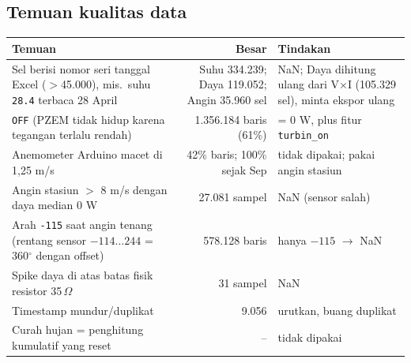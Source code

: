 \documentclass[10.5pt,a4paper]{article}
\newcommand{\cmd}[1]{\texttt{#1}}
\begin{document}
\subsection{Temuan kualitas data}
\begin{center}
\small
\begin{tabularx}{\linewidth}{@{}X r X@{}}
\toprule
Temuan & Besar & Tindakan \\
\midrule
Sel berisi nomor seri tanggal Excel ($>$45.000), mis.\ suhu \cmd{28.4} terbaca 28 April & Suhu 334.239; Daya 119.052; Angin 35.960 sel & NaN; Daya dihitung ulang dari V$\times$I (105.329 sel), minta ekspor ulang \\
\cmd{OFF} (PZEM tidak hidup karena tegangan terlalu rendah) & 1.356.184 baris (61\%) & = 0 W, plus fitur \cmd{turbin\_on} \\
Anemometer Arduino macet di 1,25 m/s & 42\% baris; 100\% sejak Sep & tidak dipakai; pakai angin stasiun \\
Angin stasiun $>$ 8 m/s dengan daya median 0 W & 27.081 sampel & NaN (sensor salah) \\
Arah \cmd{-115} saat angin tenang (rentang sensor $-114\ldots244$ = 360$^\circ$ dengan offset) & 578.128 baris & hanya $-115$ $\to$ NaN \\
Spike daya di atas batas fisik resistor 35\,$\Omega$ & 31 sampel & NaN \\
Timestamp mundur/duplikat & 9.056 & urutkan, buang duplikat \\
Curah hujan = penghitung kumulatif yang reset & -- & tidak dipakai \\
\bottomrule
\end{tabularx}
\end{center}
\end{document}
